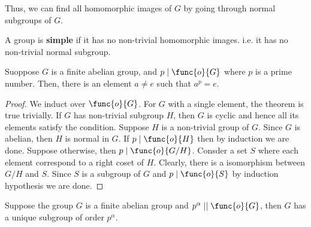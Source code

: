 Thus, we can find all homomorphic images of \(G\) by going through normal subgroups of \(G\).

\begin{definition}
    A group is \textbf{simple} if it has no non-trivial homomorphic images. i.e. it has no non-trivial normal subgroup.
\end{definition}

\begin{theorem}\label{thm:CauchyForAbelian}
    Suoppose \(G\) is a finite abelian group, and \(p \mid \func{o}{G}\) where \(p\) is a prime number. Then, there is an element \(a \neq e\) such that \(a^p = e\).
\end{theorem}

\begin{proof}
    We induct over \(\func{o}{G}\). For \(G\) with a single element, the theorem is true trivially. If \(G\) has non-trivial subgroup \(H\), then \(G\) is cyclic and hence all its elements satisfy the condition. Suppose \(H\) is a non-trivial group of \(G\). Since \(G\) is abelian, then \(H\) is normal in \(G\). If \(p \mid \func{o}{H}\) then by induction we are done. Suppose otherwise, then \(p \mid \func{o}{G/H}\). Consder a set \(S\) where each element correspond to a right coset of \(H\). Clearly, there is a isomorphism between \(G/H\) and \(S\). Since \(S\) is a subgroup of \(G\) and \(p \mid \func{o}{S}\) by induction hypothesis we are done.
\end{proof}

\begin{theorem}
    Suppose the group \(G\) is a finite abelian group and \(p^{\alpha} \mid\mid \func{o}{G}\), then \(G\) has a unique subgroup of order \(p^{\alpha}\).
\end{theorem}

